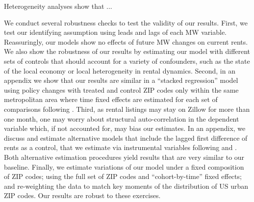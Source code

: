 Heterogeneity analyses show that ...


We conduct several robustness checks to test the validity of our results.
First, we test our identifying assumption using leads and lags of each MW variable.
Reassuringly, our models show no effects of future MW changes on current rents.
We also show the robustness of our results by estimating our model with different 
sets of controls that should account for a variety of confounders, such as the state
of the local economy or local heterogeneity in rental dynamics.
Second, in an appendix we show that our results are similar in a ``stacked regression'' 
model using policy changes with treated and control ZIP codes only within the same 
metropolitan area where time fixed effects are estimated for each set of comparisons 
following \parencite[similar to][]{CegnizEtAl2019}.
Third, as rental listings may stay on Zillow for more than one month, one may worry 
about structural auto-correlation in the dependent variable which, if not accounted for, 
may bias our estimates.
In an appendix, we discuss and estimate alternative models that include the 
lagged first difference of rents as a control, that we estimate via instrumental variables
following \textcite{ArellanoBond1991} and \textcite{MeerWest2016}.
Both alternative estimation procedures yield results that are very similar to our 
baseline.
Finally, we estimate variations of our model under a fixed composition of ZIP codes;
using the full set of ZIP codes and ``cohort-by-time'' fixed effects; and re-weighting
the data to match key moments of the distribution of US urban ZIP codes.
Our results are robust to these exercises.


